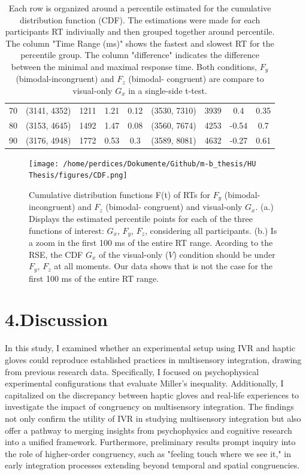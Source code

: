 \documentclass[12pt,oneside,openright]{report}
\begin{document}
\begin{table}[!ht]
{\begin{tabular}{ccccccccc}
    70 & (3141, 4352) & 1211 & 1.21 & 0.12 & (3530, 7310) & 3939 & 0.4 & 0.35 \\
    80 & (3153, 4645) & 1492 & 1.47 & 0.08 & (3560, 7674) & 4253 & -0.54 & 0.7 \\
    90 & (3176, 4948) & 1772 & 0.53 & 0.3 & (3589, 8081) & 4632 & -0.27 & 0.61 \\ \hline
    \end{tabular}}
    \caption{Each row is organized around a percentile estimated for the cumulative distribution function (CDF). The estimations were made for each participants RT indiviually and then grouped together around percentile. The column "Time Range (ms)" shows the fastest and slowest RT for the percentile group. The column "difference" indicates the difference between the minimal and maximal response time. Both conditions, $F_y$ (bimodal-incongruent) and $F_z$ (bimodal- congruent) are compare to visual-only $G_x$ in a single-side t-test.}
    \label{tab:response-time-range}
\end{table}


\begin{figure}[!ht]
    \centering
    \texttt{[image: /home/perdices/Dokumente/Github/m-b\_thesis/HU Thesis/figures/CDF.png]}
    \caption{ Cumulative distribution functions F(t) of RTs for $F_y$ (bimodal-incongruent) and $F_z$ (bimodal- congruent) and visual-only $G_x$. (a.) Displays the estimated percentile points for each of the three functions of interest: $G_x$, $F_y$, $F_z$, considering all participants. 
    (b.) Is a zoom in the first 100 ms of the entire RT range. Acording to the RSE, the CDF $G_x$ of the visual-only ($V$) condition should be under $F_y$, $F_z$ at all moments. Our data shows that is not the case for the first 100 ms of the entire RT range.}
    \label{fig:CDF}
\end{figure}


\section*{4.Discussion}

In this study, I examined whether an experimental setup using IVR and haptic gloves could reproduce established practices in multisensory integration, drawing from previous research data. Specifically, I focused on psychophysical experimental configurations that evaluate Miller's inequality. Additionally, I capitalized on the discrepancy between haptic gloves and real-life experiences to investigate the impact of congruency on multisensory integration. The findings not only confirm the utility of IVR in studying multisensory integration but also offer a pathway to merging insights from psychophysics and cognitive research into a unified framework. Furthermore, preliminary results prompt inquiry into the role of higher-order congruency, such as "feeling touch where we see it," in early integration processes extending beyond temporal and spatial congruencies.
\end{document}
